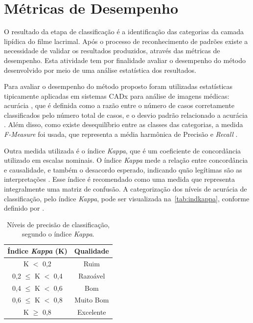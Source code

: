 \section{Métricas de Desempenho} 
\label{sec:validacao}

O resultado da etapa de classificação é a identificação das categorias da camada lipídica do filme lacrimal. Após o processo de reconhecimento de padrões existe a necessidade de validar os resultados produzidos, através das métricas de desempenho. Esta atividade tem por finalidade avaliar o desempenho do método desenvolvido por meio de uma análise estatística dos resultados.

Para avaliar o desempenho do método proposto foram utilizadas estatísticas tipicamente aplicadas em sistemas CADx para análise de imagens médicas: acurácia \cite{duda1973pattern}, que é definida como a razão entre o número de casos corretamente classificados pelo número total de casos, e o desvio padrão relacionado a acurácia \cite{viera2005understanding}. Além disso, como existe desequilíbrio entre as classes das categorias, a medida \textit{F-Measure} foi usada, que representa a média harmônica de Precisão e \textit{Recall} \cite{fawcett2006introduction}.


Outra medida utilizada é o índice \textit{Kappa}, que é um coeficiente de concordância utilizado em escalas nominais. O índice \textit{Kappa} mede a relação entre concordância e causalidade, e também o desacordo esperado, indicando quão legítimas são as interpretações \cite{rosenfield1986coefficient}. Esse índice é recomendado como uma medida que representa integralmente uma matriz de confusão. A categorização dos níveis de acurácia de classificação, pelo índice \textit{Kappa}, pode ser visualizada na~\autoref{tab:indkappa}, conforme definido por .

\begin{table}[ht!]
\centering
{}
\onehalfspacing
\caption{Níveis de precisão de classificação, segundo o índice \textit{Kappa}.}
\label{tab:indkappa}
\begin{tabular}{cc}
\hline
\textbf{Índice \textit{Kappa} (K)} & \textbf{Qualidade} \\ \hline \hline
K $<$ 0,2                & Ruim              \\
0,2 $\leq$ K $<$ 0,4     & Razoável       \\
0,4 $\leq$ K $<$ 0,6     & Bom             \\
0,6 $\leq$ K $<$ 0,8     & Muito Bom        \\
K $\geq$ 0,8             & Excelente        \\ \hline
\end{tabular}
\end{table}


